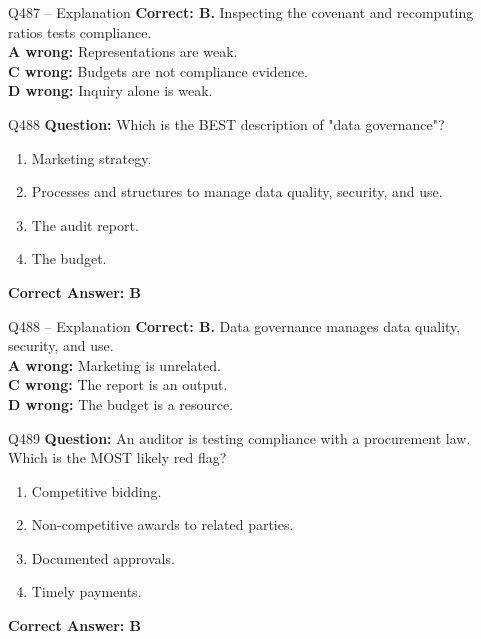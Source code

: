 \documentclass[aspectratio=169,10pt]{beamer}
\begin{document}
	\begin{frame}[t]{Q487 -- Explanation}
		\small
		\textbf{Correct: B.} Inspecting the covenant and recomputing ratios tests compliance. \\[4pt]
		\textbf{A wrong:} Representations are weak. \\[2pt]
		\textbf{C wrong:} Budgets are not compliance evidence. \\[2pt]
		\textbf{D wrong:} Inquiry alone is weak.
	\end{frame}
	
	\begin{frame}[t]{Q488}
		\small
		\textbf{Question:} Which is the BEST description of "data governance"?
		\begin{enumerate}[label=\Alph*.,itemsep=1pt,topsep=2pt]
			\item Marketing strategy.
			\item Processes and structures to manage data quality, security, and use.
			\item The audit report.
			\item The budget.
		\end{enumerate}
		\vspace{4pt}
		\textbf{Correct Answer: B}
	\end{frame}
	
	\begin{frame}[t]{Q488 -- Explanation}
		\small
		\textbf{Correct: B.} Data governance manages data quality, security, and use. \\[4pt]
		\textbf{A wrong:} Marketing is unrelated. \\[2pt]
		\textbf{C wrong:} The report is an output. \\[2pt]
		\textbf{D wrong:} The budget is a resource.
	\end{frame}
	
	\begin{frame}[t]{Q489}
		\small
		\textbf{Question:} An auditor is testing compliance with a procurement law. Which is the MOST likely red flag?
		\begin{enumerate}[label=\Alph*.,itemsep=1pt,topsep=2pt]
			\item Competitive bidding.
			\item Non-competitive awards to related parties.
			\item Documented approvals.
			\item Timely payments.
		\end{enumerate}
		\vspace{4pt}
		\textbf{Correct Answer: B}
	\end{frame}
	
\end{document}

